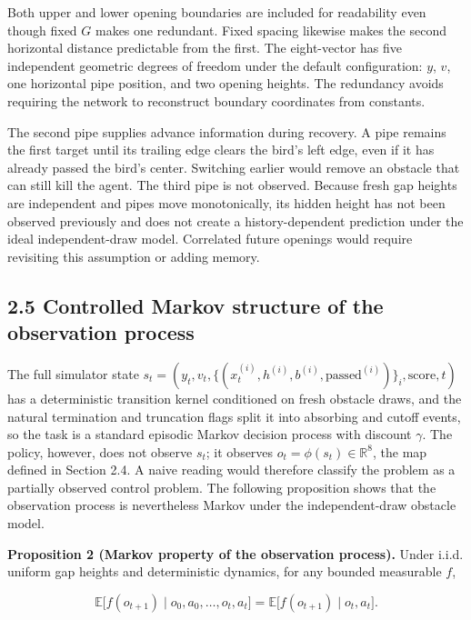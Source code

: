 \documentclass[
  11pt,
]{article}
\begin{document}
Both upper and lower opening boundaries are included for readability
even though fixed \(G\) makes one redundant. Fixed spacing likewise
makes the second horizontal distance predictable from the first. The
eight-vector has five independent geometric degrees of freedom under the
default configuration: \(y\), \(v\), one horizontal pipe position, and
two opening heights. The redundancy avoids requiring the network to
reconstruct boundary coordinates from constants.

The second pipe supplies advance information during recovery. A pipe
remains the first target until its trailing edge clears the bird's left
edge, even if it has already passed the bird's center. Switching earlier
would remove an obstacle that can still kill the agent. The third pipe
is not observed. Because fresh gap heights are independent and pipes
move monotonically, its hidden height has not been observed previously
and does not create a history-dependent prediction under the ideal
independent-draw model. Correlated future openings would require
revisiting this assumption or adding memory.

\subsection{2.5 Controlled Markov structure of the observation
process}\label{controlled-markov-structure-of-the-observation-process}

The full simulator state
\(s_t=(y_t,v_t,\{(x^{(i)}_t,h^{(i)},b^{(i)},\text{passed}^{(i)})\}_i,\text{score},t)\)
has a deterministic transition kernel conditioned on fresh obstacle
draws, and the natural termination and truncation flags split it into
absorbing and cutoff events, so the task is a standard episodic Markov
decision process with discount \(\gamma\). The policy, however, does not
observe \(s_t\); it observes \(o_t=\phi(s_t)\in\mathbb R^8\), the map
defined in Section 2.4. A naive reading would therefore classify the
problem as a partially observed control problem. The following
proposition shows that the observation process is nevertheless Markov
under the independent-draw obstacle model.

\textbf{Proposition 2 (Markov property of the observation process).}
Under i.i.d. uniform gap heights and deterministic dynamics, for any
bounded measurable \(f\),

\[
\mathbb E\bigl[f(o_{t+1})\mid o_0,a_0,\ldots,o_t,a_t\bigr]
=\mathbb E\bigl[f(o_{t+1})\mid o_t,a_t\bigr].
\]
\end{document}
